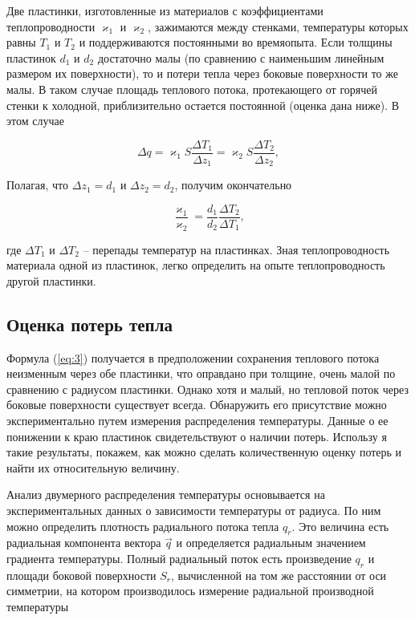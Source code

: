 \documentclass[a4paper,11.5pt]{article} %
\begin{document}
Две пластинки, изготовленные из материалов с коэффициентами теплопроводности $\varkappa_1$ и $\varkappa_2$, зажимаются между стенками, температуры которых равны $T_1$ и $T_2$ и поддерживаются постоянными во времяопыта. Если толщины пластинок $d_1$ и $d_2$ достаточно малы (по сравнению с наименьшим линейным размером их поверхности), то и потери тепла через боковые поверхности то
же малы. В таком случае площадь теплового потока, протекающего от горячей стенки к холодной, приблизительно остается постоянной (оценка дана ниже). В этом случае

\begin{equation}
	\Delta q =  \varkappa_1 S \frac{\Delta T_1}{\Delta z_1} =  \varkappa_2 S \frac{\Delta T_2}{\Delta z_2},
	\label{eq:2}
\end{equation}

Полагая, что $\Delta z_1 = d_1$ и $\Delta z_2 = d_2$, получим окончательно 

\begin{equation}
	\frac{\varkappa_1}{\varkappa_2} = \frac{d_1}{d_2}\frac{\Delta T_2}{\Delta T_1},
	\label{eq:3}
\end{equation} 

где $\Delta T_1$ и $\Delta T_2$ -- перепады температур на пластинках. Зная теплопроводность материала одной из пластинок, легко определить на опыте
теплопроводность другой пластинки.

\subsection{Оценка потерь тепла}
Формула (\ref{eq:3}) получается в предположении сохранения теплового потока неизменным через обе пластинки, что оправдано при толщине, очень малой по сравнению с радиусом пластинки. Однако хотя и малый, но тепловой поток через боковые поверхности существует всегда. Обнаружить его присутствие можно экспериментально путем измерения распределения температуры. Данные о ее понижении к краю пластинок свидетельствуют о наличии потерь. Использу я такие результаты, покажем, как можно сделать количественную оценку потерь
и найти их относительную величину.

Анализ двумерного распределения температуры основывается на экспериментальных данных о зависимости температуры от радиуса. По ним можно определить плотность радиального потока тепла $q_r$. Это величина есть радиальная компонента вектора $\vec{q}$ и определяется радиальным значением градиента температуры. Полный радиальный поток есть произведение $q_r$ и
площади боковой поверхности $S_r$, вычисленной на том же расстоянии
от оси симметрии, на котором производилось измерение радиальной
производной температуры
\end{document}
